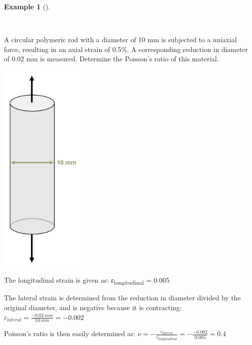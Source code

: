 \documentclass[
  letterpaper,
  DIV=11,
  numbers=noendperiod]{scrreprt}
\theoremstyle{definition}
\newtheorem{example}{Example}[chapter]
\theoremstyle{remark}
\begin{document}
\begin{tcolorbox}[enhanced jigsaw, colback=white, colframe=quarto-callout-tip-color-frame, toptitle=1mm, arc=.35mm, bottomrule=.15mm, toprule=.15mm, opacitybacktitle=0.6, title={Example 4.2}, coltitle=black, breakable, colbacktitle=quarto-callout-tip-color!10!white, bottomtitle=1mm, titlerule=0mm, opacityback=0, leftrule=.75mm, left=2mm, rightrule=.15mm]

\begin{example}[]\protect\hypertarget{exm-4.2}{}\label{exm-4.2}

~

A circular polymeric rod with a diameter of 10 mm is subjected to a
uniaxial force, resulting in an axial strain of 0.5\%. A corresponding
reduction in diameter of 0.02 mm is measured. Determine the Poisson's
ratio of this material.

\begin{center}
\includegraphics[width=1.61458in,height=\textheight]{images/Chapter 4 edits v2/example 4.2 v2.png}
\end{center}

\begin{tcolorbox}[enhanced jigsaw, colback=white, colframe=quarto-callout-tip-color-frame, toptitle=1mm, arc=.35mm, bottomrule=.15mm, toprule=.15mm, opacitybacktitle=0.6, title={Solution}, coltitle=black, breakable, colbacktitle=quarto-callout-tip-color!10!white, bottomtitle=1mm, titlerule=0mm, opacityback=0, leftrule=.75mm, left=2mm, rightrule=.15mm]

The longitudinal strain is given as: ε\textsubscript{longitudinal} =
0.005

The lateral strain is determined from the reduction in diameter divided
by the original diameter, and is negative because it is contracting:
\(\varepsilon_{lateral}=\frac{-0.02{~mm}}{10{~mm}}=-0.002\)

Poisson's ratio is then easily determined as:
\(\nu=-\frac{\varepsilon_{lateral}}{\varepsilon_{longitudinal}}=-\frac{-0.002}{0.005}=0.4\)

\end{tcolorbox}

\end{example}

\end{tcolorbox}
\end{document}

